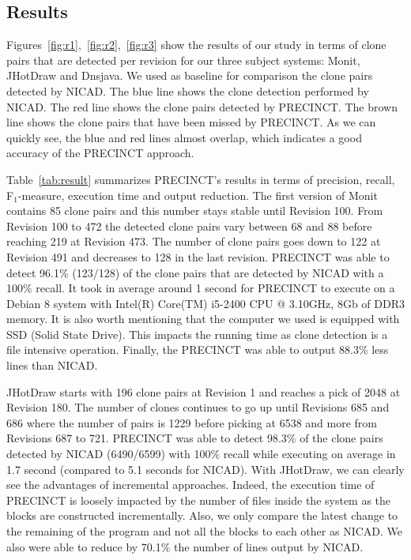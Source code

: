 \documentclass[conference]{IEEEtran}
\begin{document}


\subsection{Results}
\label{sub:Results}

Figures~\ref{fig:r1},~\ref{fig:r2},~\ref{fig:r3} show the results of our study in terms of clone pairs that are detected per revision for our three subject systems: Monit, JHotDraw and Dnsjava. We used as baseline for comparison the clone pairs detected by NICAD. The blue line shows the clone detection performed by NICAD. The red line shows the clone pairs detected by PRECINCT. The brown line shows the clone pairs that have been missed by PRECINCT. As we can quickly see, the blue and red lines almost overlap, which indicates a good accuracy of the PRECINCT approach.



Table~\ref{tab:result} summarizes PRECINCT's results in terms of precision, recall, F$_{1}$-measure, execution time and output reduction.
The first version of Monit contains 85 clone pairs and this number stays stable until Revision 100. From Revision 100 to 472 the detected clone pairs vary between 68 and 88 before reaching 219 at Revision 473.
The number of clone pairs goes down to 122 at Revision 491 and decreases to 128 in the last revision. PRECINCT was able to detect 96.1\% (123/128) of the clone pairs that are detected by NICAD with a 100\% recall.
It took in average around 1 second for PRECINCT to execute on a Debian 8 system with Intel(R) Core(TM) i5-2400 CPU @ 3.10GHz, 8Gb of DDR3 memory.
It is also worth mentioning that the computer we used is equipped with SSD (Solid State Drive).
This impacts the running time as clone detection is a file intensive operation.
Finally, the PRECINCT was able to output 88.3\% less lines than NICAD.

JHotDraw starts with 196 clone pairs at Revision 1 and reaches a pick of 2048 at Revision 180. The number of clones  continues to go up until Revisions 685 and 686 where the number of pairs is 1229 before picking at 6538 and more from Revisions 687 to 721.
PRECINCT was able to detect 98.3\% of the clone pairs detected by NICAD (6490/6599) with 100\% recall while executing on average in 1.7 second (compared to 5.1 seconds for NICAD).
With JHotDraw, we can clearly see the advantages of incremental approaches.
Indeed, the execution time of PRECINCT is loosely impacted by the number of files inside the system as the blocks are constructed incrementally.
Also, we only compare the latest change to the remaining of the program and not all the blocks to each other as NICAD.
We also were able to reduce by 70.1\% the number of lines output by NICAD.
\end{document}

